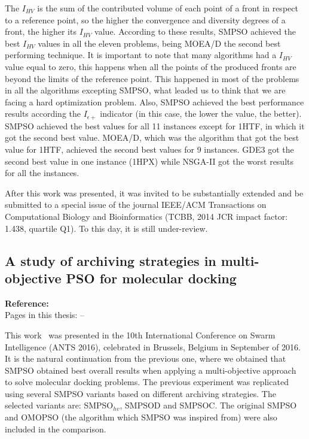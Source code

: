 The $I_{HV}$ is the sum of the contributed volume of each point of a front in respect to a reference point, so the higher the convergence and diversity degrees of a front, the higher its $I_{HV}$ value. According to these results, SMPSO achieved the best $I_{HV}$ values in all the eleven problems, being MOEA/D the second best performing technique. It is important to note that many algorithms had a $I_{HV}$ value equal to zero, this happens when all the points of the produced fronts are beyond the limits of the reference point. This happened in most of the problems in all the algorithms excepting SMPSO, what leaded us to think that we are facing a hard optimization problem.
Also, SMPSO achieved the best performance results according the $I_{\epsilon+}$ indicator (in this case, the lower the value, the better). SMPSO achieved the best values for all 11 instances except for 1HTF, in which it got the second best value. MOEA/D, which was the algorithm that got the best value for 1HTF, achieved the second best values for 9 instances. GDE3 got the second best value in one instance (1HPX) while NSGA-II got the worst results for all the instances.

After this work was presented, it was invited to be substantially extended and be submitted to a special issue of the journal IEEE/ACM Transactions on Computational Biology and Bioinformatics (TCBB, 2014 JCR impact factor: 1.438, quartile Q1). To this day, it is still under-review.

\subsection{A study of archiving strategies in multi-objective PSO for molecular docking}

\textbf{Reference:}~\cite{GarciaNieto2016ANTS} \\
Pages in this thesis: \pageref{start-pdf/ants.pdf} -- \pageref{stop-pdf/ants.pdf}

This work~\cite{GarciaNieto2016ANTS} was presented in the 10th International Conference on Swarm Intelligence (ANTS 2016), celebrated in Brussels, Belgium in September of 2016. It is the natural continuation from the previous one, where we obtained that SMPSO obtained best overall results when applying a multi-objective approach to solve molecular docking problems. The previous experiment was replicated using several SMPSO variants based on different archiving strategies. The selected variants are: SMPSO$_{hv}$, SMPSOD and SMPSOC. The original SMPSO and OMOPSO (the algorithm which SMPSO was inspired from) were also included in the comparison.

